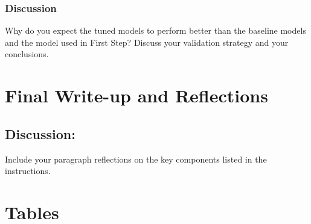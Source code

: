 \documentclass[11pt]{article}
\begin{document}
\subsubsection{Discussion}

Why do you expect the tuned models to perform better than the baseline models and the model used in First Step? Discuss your validation strategy and your conclusions.

\section{Final Write-up and Reflections}

\subsection{Discussion:} 

Include your paragraph reflections on the key components listed in the instructions.


\newpage
\section{Tables}

\listoftables
\vspace{5pt}
\end{document}
